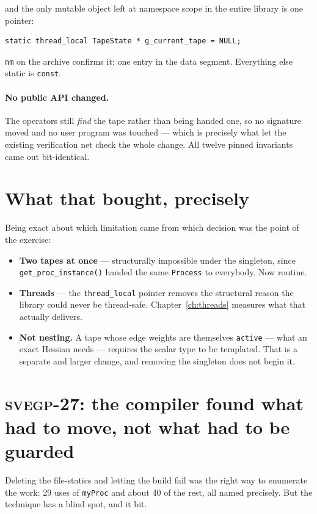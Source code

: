 \documentclass[11pt,a4paper]{report}
\newcommand{\svegp}[1]{\textsc{svegp-#1}}
\newcommand{\code}[1]{\texttt{#1}}
\begin{document}
and the only mutable object left at namespace scope in the entire library is one
pointer:

\begin{lstlisting}
static thread_local TapeState * g_current_tape = NULL;
\end{lstlisting}

\noindent
\code{nm} on the archive confirms it: one entry in the data segment. Everything
else static is \code{const}.

\paragraph{No public API changed.} The operators still \emph{find} the tape
rather than being handed one, so no signature moved and no user program was
touched --- which is precisely what let the existing verification net check the
whole change. All twelve pinned invariants came out bit-identical.

\section{What that bought, precisely}

Being exact about which limitation came from which decision was the point of the
exercise:

\begin{itemize}
\item \textbf{Two tapes at once} --- structurally impossible under the
      singleton, since \code{get\_proc\_instance()} handed the same
      \code{Process} to everybody. Now routine.
\item \textbf{Threads} --- the \code{thread\_local} pointer removes the
      structural reason the library could never be thread-safe.
      Chapter~\ref{ch:threads} measures what that actually delivers.
\item \textbf{Not nesting.} A tape whose edge weights are themselves
      \code{active} --- what an exact Hessian needs --- requires the scalar type
      to be templated. That is a separate and larger change, and removing the
      singleton does not begin it.
\end{itemize}

\section{\svegp{27}: the compiler found what had to move, not what had to be guarded}

Deleting the file-statics and letting the build fail was the right way to
enumerate the work: 29 uses of \code{myProc} and about 40 of the rest, all named
precisely. But the technique has a blind spot, and it bit.
\end{document}
